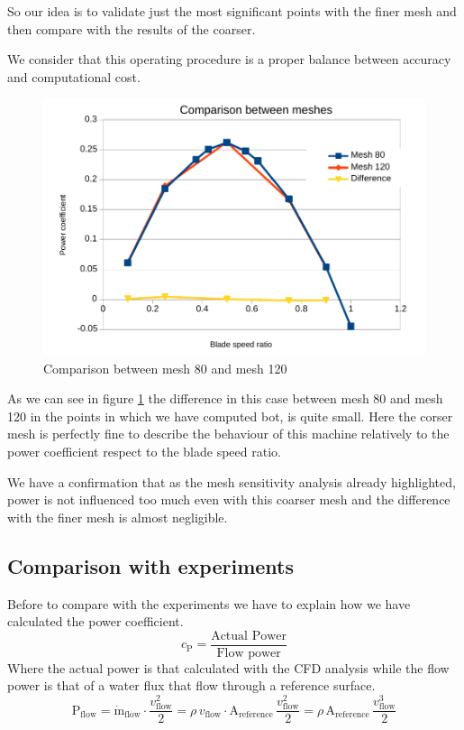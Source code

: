 \documentclass[a4paper,12pt]{article}
\begin{document}
So our idea is to validate just the most significant points with the finer mesh and then compare with the results of the coarser.

We consider that this operating procedure is a proper balance between accuracy and computational cost.

\begin{figure}[hbtp]
\centering
\includegraphics[width=15cm]{images/bsr/bsr-mesh80-120.pdf}
\caption{Comparison between mesh 80 and mesh 120}
\label{fig:bsr-comparison-80-120}
\end{figure}

As we can see in figure \ref{fig:bsr-comparison-80-120} the difference in this case between mesh 80 and mesh 120 in the points in which we have computed bot, is quite small.
Here the corser mesh is perfectly fine to describe the behaviour of this machine relatively to the power coefficient respect to the blade speed ratio.

We have a confirmation that as the mesh sensitivity analysis already highlighted, power is not influenced too much even with this coarser mesh and the difference with the finer mesh is almost negligible.

\subsection{Comparison with experiments}

Before to compare with the experiments we have to explain how we have calculated the power coefficient.
\begin{equation}
c_\text{P} = \dfrac{\text{Actual Power}}{\text{Flow power}}
\end{equation}
Where the actual power is that calculated with the CFD analysis while the flow power is that of a water flux that flow through a reference surface. 
\begin{equation}
\text{P}_\text{flow} 
= \dot{\text{m}}_\text{flow} \cdot \dfrac{v^2_\text{flow}}{2} 
= \rho \, v_\text{flow} \cdot \text{A}_\text{reference} \, \dfrac{v^2_\text{flow}}{2} 
= \rho \, \text{A}_\text{reference} \, \dfrac{v^3_\text{flow}}{2}
\end{equation}
\end{document}
